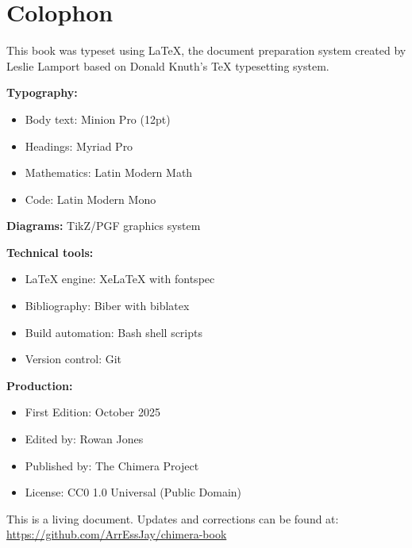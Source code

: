 \documentclass[11pt,oneside]{book}
\begin{document}


\printindex

\chapter*{Colophon}

This book was typeset using \LaTeX{}, the document preparation system created by Leslie Lamport based on Donald Knuth's \TeX{} typesetting system.

\textbf{Typography:}
\begin{itemize}
\item Body text: Minion Pro (12pt)
\item Headings: Myriad Pro
\item Mathematics: Latin Modern Math
\item Code: Latin Modern Mono
\end{itemize}

\textbf{Diagrams:} TikZ/PGF graphics system

\textbf{Technical tools:}
\begin{itemize}
\item \LaTeX{} engine: Xe\LaTeX{} with fontspec
\item Bibliography: Biber with biblatex
\item Build automation: Bash shell scripts
\item Version control: Git
\end{itemize}

\textbf{Production:}
\begin{itemize}
\item First Edition: October 2025
\item Edited by: Rowan Jones
\item Published by: The Chimera Project
\item License: CC0 1.0 Universal (Public Domain)
\end{itemize}

This is a living document. Updates and corrections can be found at:\\
\url{https://github.com/ArrEssJay/chimera-book}

\newpage
\thispagestyle{empty}

\end{document}
